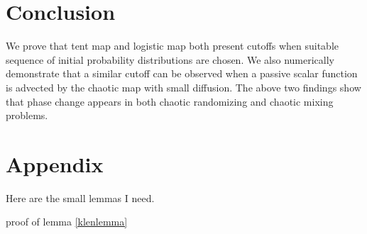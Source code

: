 \documentclass{article}
\begin{document}



\section{Conclusion}
We prove that tent map and logistic map both present cutoffs when suitable sequence of initial probability distributions are chosen. We also numerically demonstrate that a similar cutoff can be observed when a passive scalar function is advected by the chaotic map with small diffusion. The above two findings show that phase change appears in both chaotic randomizing and chaotic mixing problems. 



\section{Appendix}
Here are the small lemmas I need.

proof of lemma \ref{klenlemma}
\end{document}
